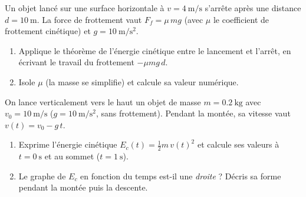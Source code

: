 \documentclass[11pt,a4paper]{article}
\begin{document}

\begin{exo}
Un objet lancé sur une surface horizontale à $v=\qty{4}{\metre\per\second}$ s'arrête après une
distance $d=\qty{10}{\metre}$. La force de frottement vaut $F_f=\mu\,mg$ (avec $\mu$ le coefficient de
frottement cinétique) et $g=\qty{10}{\metre\per\second\squared}$.
\begin{enumerate}[label=\alph*)]
  \item Applique le théorème de l'énergie cinétique entre le lancement et l'arrêt, en écrivant le
        travail du frottement $-\mu mg\,d$.
  \item Isole $\mu$ (la masse se simplifie) et calcule sa valeur numérique.
\end{enumerate}
\end{exo}

\begin{exo}
On lance verticalement vers le haut un objet de masse $m=\qty{0,2}{\kilogram}$ avec
$v_0=\qty{10}{\metre\per\second}$ ($g=\qty{10}{\metre\per\second\squared}$, sans frottement). Pendant la
montée, sa vitesse vaut $v(t)=v_0-g\,t$.
\begin{enumerate}[label=\alph*)]
  \item Exprime l'énergie cinétique $E_c(t)=\tfrac12 m\,v(t)^2$ et calcule ses valeurs à $t=\qty{0}{\second}$
        et au sommet ($t=\qty{1}{\second}$).
  \item Le graphe de $E_c$ en fonction du temps est-il une \emph{droite} ? Décris sa forme pendant la
        montée puis la descente.
\end{enumerate}
\end{exo}
\end{document}
